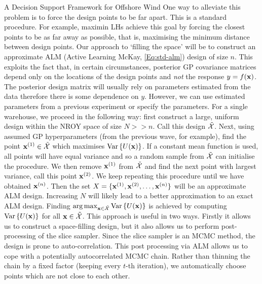 \begin{chapter}{A Decision Support Framework for Offshore Wind \label{Ch:ds-for-ow}}
One way to alleviate this problem is to force the design points to be far apart. This is a standard procedure. For example, maximin LHs achieve this goal by forcing the closest points to be as far away as possible, that is, maximising the minimum distance between design points. Our approach to `filling the space' will be to construct an approximate ALM (Active Learning McKay, \cref{Eq:std-alm}) design of size $n$. This exploits the fact that, in certain circumstances, posterior GP covariance matrices depend only on the locations of the design points and \textit{not} the response $y = f(\mathbf{x})$. The posterior design matrix will usually rely on parameters estimated from the data therefore there is some dependence on $y$. However, we can use estimated parameters from a previous experiment or specify the parameters. For a single warehouse, we proceed in the following way: first construct a large, uniform design within the NROY space of size $N>>n$. Call this design $\tilde{\mathcal{X}}$. Next, using assumed GP hyperparameters (from the previous wave, for example), find the point $\mathbf{x}^{(1)} \in \tilde{\mathcal{X}}$ which maximises $\mathrm{Var}\,\{ U(\mathbf{x}) \}$. If a constant mean function is used, all points will have equal variance and so a random sample from $\tilde{\mathcal{X}}$ can initialise the procedure. We then remove $\mathbf{x}^{(1)}$ from $\tilde{\mathcal{X}}$ and find the next point with largest variance, call this point $\mathbf{x}^{(2)}$. We keep repeating this procedure until we have obtained $\mathbf{x}^{(n)}$. Then the set $X = \{\mathbf{x}^{(1)}, \mathbf{x}^{(2)}, \ldots, \mathbf{x}^{(n)}\}$ will be an approximate ALM design. Increasing $N$ will likely lead to a better approximation to an exact ALM design. Finding $\operatorname*{arg\,max}_{\mathbf{x} \in \tilde{\mathcal{X}}} \mathrm{Var}\, \{ U(\mathbf{x}) \}$ is achieved by computing $\mathrm{Var}\, \{ U(\mathbf{x}) \}$ for all $\mathbf{x} \in \tilde{\mathcal{X}}$. This approach is useful in two ways. Firstly it allows us to construct a space-filling design, but it also allows us to perform post-processing of the slice sampler. Since the slice sampler is an MCMC method, the design is prone to auto-correlation. This post processing via ALM allows us to cope with a potentially autocorrelated MCMC chain. Rather than thinning the chain by a fixed factor (keeping every $t$-th iteration), we automatically choose points which are not close to each other.


\end{chapter}
